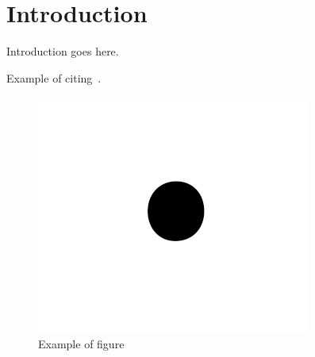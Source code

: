 \section{Introduction}

Introduction goes here.

Example of citing~\cite{291164}.











\begin{figure}[htbp!]
  \centering
  \includegraphics[width=\columnwidth]{figures/occupy.pdf}
  \caption{\label{fig:label} Example of figure}
\end{figure}
